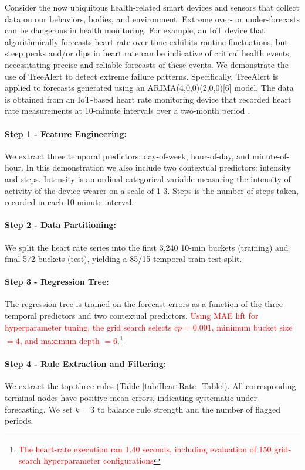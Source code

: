 \documentclass[]{interact}
\newcommand{\matt}[1]{\textcolor{red}{#1}}
\theoremstyle{definition}
\begin{document}
Consider the now ubiquitous health-related smart devices and sensors that collect data on our behaviors, bodies, and environment. Extreme over- or under-forecasts can be dangerous in health monitoring. For example, an IoT device that algorithmically forecasts heart-rate over time exhibits routine fluctuations, but steep peaks and/or dips in heart rate can be indicative of critical health events, necessitating precise and reliable forecasts of these events. We demonstrate the use of TreeAlert to detect extreme failure patterns. Specifically, TreeAlert is applied to forecasts  generated using an ARIMA(4,0,0)(2,0,0)[6] model.  The data is obtained from an IoT-based heart rate monitoring device that recorded heart rate measurements at 10-minute intervals over a two-month period \citep{furberg2016}. %

\paragraph*{Step 1 - Feature Engineering:}
We extract three temporal predictors: day-of-week, hour-of-day, and minute-of-hour. In this demonstration we also include two contextual predictors: intensity and steps. Intensity is an ordinal categorical variable measuring the intensity of activity of the device wearer on a scale of 1-3. Steps is the number of steps taken, recorded in each 10-minute interval.

\paragraph*{Step 2 - Data Partitioning:}
We split the heart rate series into the first 3,240 10-min buckets (training) and final 572 buckets (test), yielding a 85/15 temporal train-test split.

\paragraph*{Step 3 - Regression Tree:}
The regression tree is trained on the forecast errors as a function of the three temporal predictors and two contextual predictors. \matt{Using MAE lift for hyperparameter tuning, the grid search selects $cp = 0.001$, minimum bucket size $=4$, and maximum depth $=6$.}\footnote{\matt{The heart-rate execution ran 1.40 seconds, including evaluation of 150 grid-search hyperparameter configurations}}

\paragraph*{Step 4 - Rule Extraction and Filtering:}
We extract the top three rules (Table \ref{tab:HeartRate_Table}). All corresponding terminal nodes have positive mean errors, indicating systematic under-forecasting. We set $k=3$ to balance rule strength and the number of flagged periods. %
\end{document}
